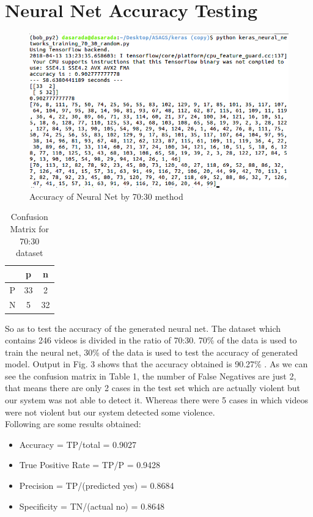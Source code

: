 \section{Neural Net Accuracy Testing}
\begin{figure}[H]
\centering
\includegraphics[width = \linewidth]{7030.png}
\caption{Accuracy of Neural Net by 70:30 method}
\end{figure}
\begin{table}[ht]
\centering
\begin{tabular}{|c|c|c|}
\hline
&p&n\\
\hline
P&33&2\\
\hline
N&5&32\\
\hline
\end{tabular}
\caption{Confusion Matrix for 70:30 dataset}
\end{table}
So as to test the accuracy of the generated neural net.
The dataset which contains 246 videos is divided in the ratio of 70:30. 70\% of the data is used to train the neural net, 30\% of the data is used to test the accuracy of generated model. Output in Fig. 3 shows that the accuracy obtained is 90.27\% . As we can see the confusion matrix in Table 1, the number of False Negatives are just 2, that means there are only 2 cases in the test set which are actually violent but our system was not able to detect it. Whereas there were 5 cases in which videos were not violent but our system detected some violence. \\
Following are some results obtained:
\begin{itemize}
	\item Accuracy = TP/total = 0.9027
	\item True Positive Rate = TP/P = 0.9428
	\item Precision = TP/(predicted yes) = 0.8684
	\item Specificity = TN/(actual no) = 0.8648
\end{itemize}
